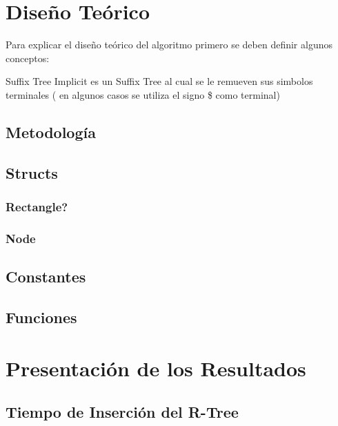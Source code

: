 \documentclass[letterpaper,10pt]{article}
\begin{document}
	\section{Diseño Teórico}
	Para explicar el diseño teórico del algoritmo primero se deben definir algunos conceptos:
	\begin{item}
	\item Suffix Tree Implicit es un Suffix Tree al cual se le remueven sus simbolos terminales ( en algunos casos se utiliza el signo \$ como terminal)

	\subsection{Metodología}

	\subsection{Structs}

	\subsubsection{Rectangle?}

	\subsubsection{Node}

	\subsection{Constantes}

	\subsection{Funciones}

	\newpage

	\section{Presentación de los Resultados}

	\subsection{Tiempo de Inserción del R-Tree}


\end{item}
\end{document}
